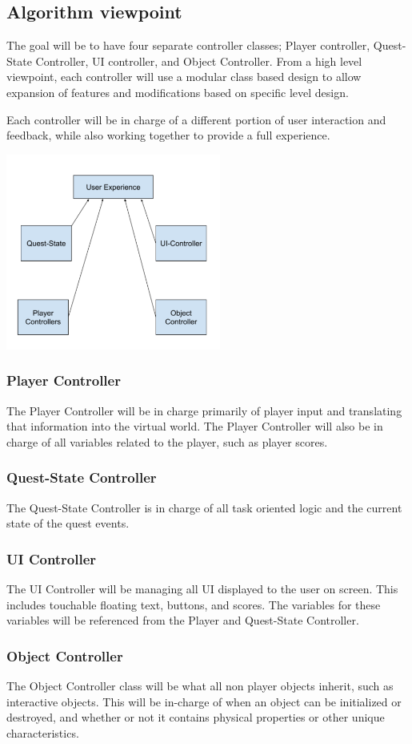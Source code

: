 \documentclass[onecolumn, draftclsnofoot,10pt, compsoc]{IEEEtran}
\begin{document}
\subsection{Algorithm viewpoint}
The goal will be to have four separate controller classes; Player controller, Quest-State Controller, UI controller, and Object Controller. From a high level viewpoint, each controller will use a modular class based design to allow expansion of features and modifications based on specific level design.

Each controller will be in charge of a different portion of user interaction and feedback, while also working together to provide a full experience.

\includegraphics[width=200pt]{AlgoDia.png}

\subsubsection{Player Controller}
The Player Controller will be in charge primarily of player input and translating that information into the virtual world. The Player Controller will also be in charge of all variables related to the player, such as player scores.
\subsubsection{Quest-State Controller}
The Quest-State Controller is in charge of all task oriented logic and the current state of the quest events.
\subsubsection{UI Controller}
The UI Controller will be managing all UI displayed to the user on screen. This includes touchable floating text, buttons, and scores. The variables for these variables will be referenced from the Player and Quest-State Controller.
\subsubsection{Object Controller}
The Object Controller class will be what all non player objects inherit, such as interactive objects. This will be in-charge of when an object can be initialized or destroyed, and whether or not it contains physical properties or other unique characteristics.
\end{document}
